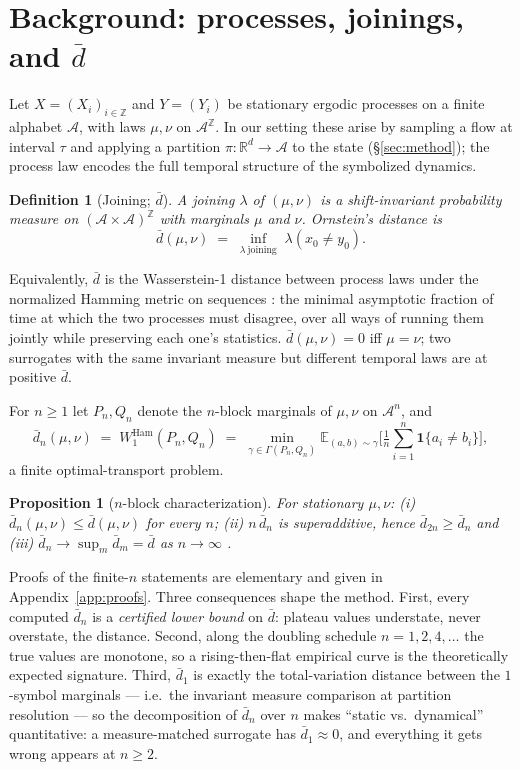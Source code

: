 \documentclass[11pt]{article}
\newtheorem{proposition}{Proposition}[section]
\newtheorem{definition}{Definition}[section]
\newcommand{\dbar}{\bar d}
\newcommand{\E}{\mathbb E}
\newcommand{\R}{\mathbb R}
\newcommand{\A}{\mathcal A}
\begin{document}
\section{Background: processes, joinings, and $\dbar$}\label{sec:background}

Let $X=(X_i)_{i\in\mathbb Z}$ and $Y=(Y_i)$ be stationary ergodic processes on a finite
alphabet $\A$, with laws $\mu,\nu$ on $\A^{\mathbb Z}$. In our setting these arise by
sampling a flow at interval $\tau$ and applying a partition
$\pi:\R^d\to\A$ to the state (\S\ref{sec:method}); the process law encodes the full
temporal structure of the symbolized dynamics.

\begin{definition}[Joining; $\dbar$]
A \emph{joining} $\lambda$ of $(\mu,\nu)$ is a shift-invariant probability measure on
$(\A\times\A)^{\mathbb Z}$ with marginals $\mu$ and $\nu$. Ornstein's distance is
\[
\dbar(\mu,\nu) \;=\; \inf_{\lambda\ \mathrm{joining}} \; \lambda\!\left(x_0 \neq y_0\right).
\]
\end{definition}

Equivalently, $\dbar$ is the Wasserstein-1 distance between process laws under the
normalized Hamming metric on sequences \citep{gray1975generalization}: the minimal
asymptotic fraction of time at which the two processes must disagree, over all ways of
running them jointly while preserving each one's statistics. $\dbar(\mu,\nu)=0$ iff
$\mu=\nu$; two surrogates with the same invariant measure but different temporal laws
are at positive $\dbar$.

For $n\ge 1$ let $P_n,Q_n$ denote the $n$-block marginals of $\mu,\nu$ on $\A^n$, and
\[
\dbar_n(\mu,\nu) \;=\; W_1^{\mathrm{Ham}}(P_n, Q_n)
 \;=\; \min_{\gamma\in\Gamma(P_n,Q_n)} \E_{(a,b)\sim\gamma}\Big[\tfrac1n \textstyle\sum_{i=1}^n
 \mathbf 1\{a_i\neq b_i\}\Big],
\]
a finite optimal-transport problem.

\begin{proposition}[$n$-block characterization]\label{prop:blocks}
For stationary $\mu,\nu$: (i) $\dbar_n(\mu,\nu)\le\dbar(\mu,\nu)$ for every $n$;
(ii) $n\,\dbar_n$ is superadditive, hence $\dbar_{2n}\ge\dbar_n$ and
(iii) $\dbar_n\to\sup_m \dbar_m = \dbar$ as $n\to\infty$
\citep{gray1975generalization}.
\end{proposition}

Proofs of the finite-$n$ statements are elementary and given in
Appendix~\ref{app:proofs}. Three consequences shape the method. First, every computed
$\dbar_n$ is a \emph{certified lower bound} on $\dbar$: plateau values understate, never
overstate, the distance. Second, along the doubling schedule $n=1,2,4,\dots$ the true
values are monotone, so a rising-then-flat empirical curve is the theoretically expected
signature. Third, $\dbar_1$ is exactly the total-variation distance between the
$1$-symbol marginals --- i.e.\ the invariant measure comparison at partition resolution
--- so the decomposition of $\dbar_n$ over $n$ makes ``static vs.\ dynamical''
quantitative: a measure-matched surrogate has $\dbar_1\approx0$, and everything it gets
wrong appears at $n\ge2$.
\end{document}
